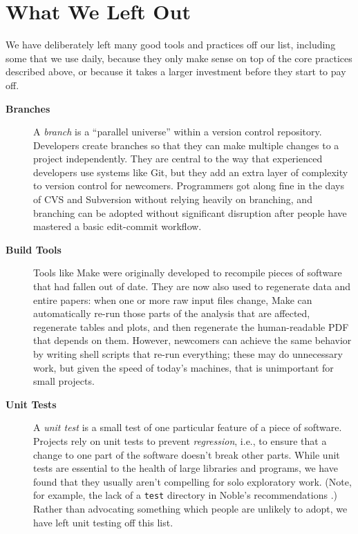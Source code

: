 \documentclass[10pt,letterpaper]{article}
\newcommand{\withurl}[2]{{#1}}
\begin{document}
\section*{What We Left Out}\label{sec:omitted}

We have deliberately left many good tools and practices off our list,
including some that we use daily, because they only make sense on top
of the core practices described above, or because it takes a larger
investment before they start to pay off.

\begin{description}

\item[\textbf{Branches}] A \emph{branch} is a ``parallel universe''
  within a version control repository. Developers create branches so
  that they can make multiple changes to a project independently. They
  are central to the way that experienced developers use systems like
  Git, but they add an extra layer of complexity to version control
  for newcomers.  Programmers got along fine in the days of CVS and
  Subversion without relying heavily on branching, and branching can
  be adopted without significant disruption after people have mastered
  a basic edit-commit workflow.

\item[\textbf{Build Tools}] Tools like
  \withurl{Make}{https://www.gnu.org/software/make/} were originally
  developed to recompile pieces of software that had fallen out of
  date. They are now also used to regenerate data and entire papers: when
  one or more raw input files change, Make can automatically re-run
  those parts of the analysis that are affected, regenerate tables and
  plots, and then regenerate the human-readable PDF that depends on
  them.  However, newcomers can achieve the same behavior by writing
  shell scripts that re-run everything; these may do unnecessary work,
  but given the speed of today's machines, that is unimportant for
  small projects.

\item[\textbf{Unit Tests}] A \emph{unit test} is a small test of one
  particular feature of a piece of software. Projects rely on unit
  tests to prevent \emph{regression}, i.e., to ensure that a change to
  one part of the software doesn't break other parts. While unit tests
  are essential to the health of large libraries and programs, we have
  found that they usually aren't compelling for solo exploratory
  work. (Note, for example, the lack of a \texttt{test} directory in
  Noble's recommendations \cite{noble2009}.)  Rather than advocating something
  which people are unlikely to adopt, we have left unit testing off
  this list.


\end{description}
\end{document}
